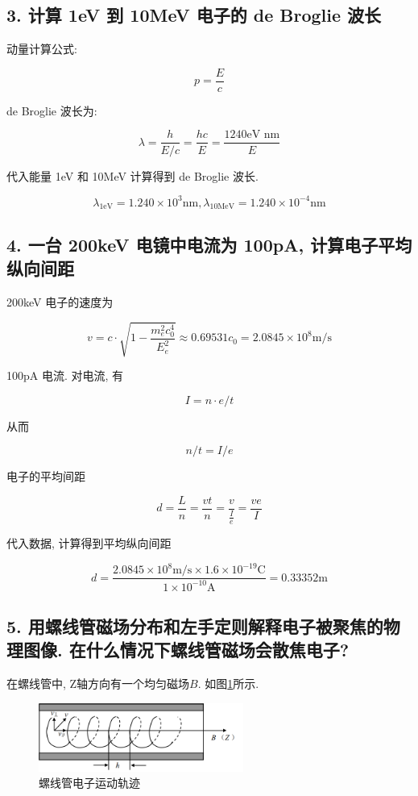 \documentclass{article}
\begin{document}
\subsection*{3. 计算 1eV 到 10MeV 电⼦的 de Broglie 波长}

动量计算公式:

$$p = \frac{E}{c}$$

de Broglie 波长为:

$$\lambda = \frac{h}{E/c} = \frac{hc}{E} = \frac{1240\text{eV nm}}{E}$$

代入能量 1eV 和 10MeV 计算得到 de Broglie 波长.

$$\lambda_{\text{1eV}} = 1.240 \times {10}^{3}\text{nm}, \lambda_{\text{10MeV}} = 1.240 \times {10}^{-4}\text{nm}$$

\subsection*{4. ⼀台 200keV 电镜中电流为 100pA, 计算电⼦平均纵向间距}

200keV 电子的速度为

$$ v = c \cdot  \sqrt{1 - \frac{m_e^2c_0^4}{E_e^2}} \approx 0.69531c_0 = 2.0845 \times {10}^{8} \text{m}/\text{s} $$

100pA 电流. 对电流, 有

$$ I = n \cdot e / t $$

从而

$$ n / t = I / e $$

电子的平均间距

$$ d = \frac{L}{n} = \frac{v t}{n} = \frac{v}{\frac{I}{e}} = \frac{v e}{I} $$

代入数据, 计算得到平均纵向间距

$$ d = \frac{2.0845 \times {10}^{8} \text{m}/\text{s} \times 1.6 \times {10}^{-19} \text{C}}{1\times {10}^{-10} \text{A}} = 0.33352 \text{m}$$

\subsection*{5. ⽤螺线管磁场分布和左⼿定则解释电⼦被聚焦的物理图像. 在什么情况下螺线管磁场会散焦电⼦? }

在螺线管中, Z轴方向有一个均匀磁场$B$. 如图\ref{fig:solenoid}所示.

\begin{figure}[ht]
    \centering
    \includegraphics[width=0.6\textwidth]{img/solenoid.png}
    \caption{螺线管电子运动轨迹}
    \label{fig:solenoid}
\end{figure}
\end{document}
